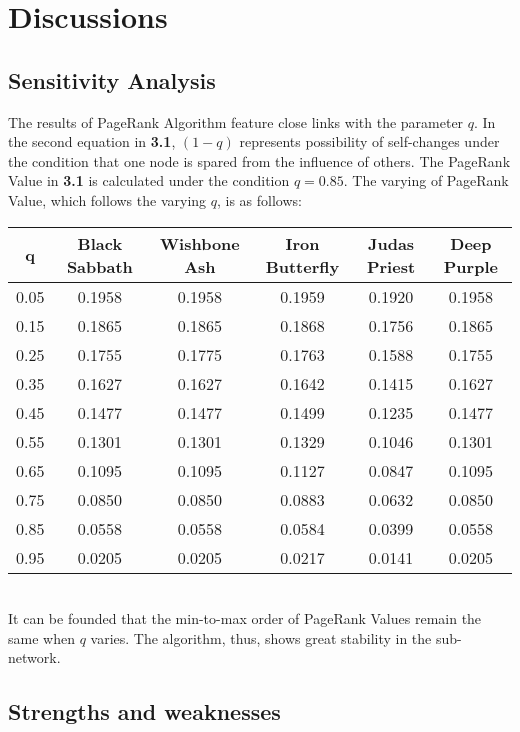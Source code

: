 \documentclass[12pt]{article}
\begin{document}
{\section{Discussions}
\subsection{Sensitivity Analysis}
The results of PageRank Algorithm feature close links with the parameter $q$. In the second equation in \textbf{3.1}, $(1-q)$ represents possibility of self-changes under the condition that one node is spared from the influence of others. The PageRank Value in \textbf{3.1} is calculated under the condition $q=0.85$. The varying of PageRank Value, which follows the varying $q$, is as follows:
\begin{table}[h]
\centering
	\begin{tabular}{|c|c|c|c|c|c|}
		\hline
		q & Black Sabbath &Wishbone Ash &Iron Butterfly & Judas Priest &Deep Purple\\
		\hline
		0.05 &0.1958 &0.1958 &0.1959 &0.1920 &0.1958\\
		0.15 &0.1865 &0.1865 &0.1868 &0.1756 &0.1865\\
		0.25 &0.1755 &0.1775 &0.1763 &0.1588 &0.1755\\
		0.35 &0.1627 &0.1627 &0.1642 &0.1415 &0.1627\\
		0.45 &0.1477 &0.1477	 &0.1499	 &0.1235	 &0.1477\\
		0.55 &0.1301 &0.1301	 &0.1329 &0.1046 &0.1301\\
		0.65 &0.1095 &0.1095 &0.1127 &0.0847 &0.1095\\
		0.75 &0.0850 &0.0850 &0.0883 &0.0632 &0.0850\\
		0.85 &0.0558 &0.0558 &0.0584 &0.0399 &0.0558\\
		0.95 &0.0205 &0.0205 &0.0217	 &0.0141 &0.0205\\
		\hline
	\end{tabular}
\end{table}\\
It can be founded that the min-to-max order of PageRank Values remain the same when $q$ varies. The algorithm, thus, shows great stability in the sub-network.
\subsection{Strengths and weaknesses}
}
\end{document}
